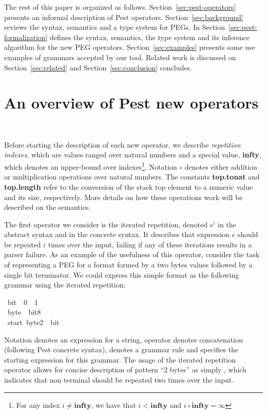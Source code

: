 \documentclass[sigplan,screen]{acmart}
\theoremstyle{definition}
\begin{document}
The rest of this paper is organized as follows.
Section~\ref{sec:pest-operators} presents an informal description of Pest operators.
Section~\ref{sec:background}
reviews the syntax, semantics and a type system for
PEGs. In Section~\ref{sec:pest-formalization} defines the syntax, semantics, the type
system and its inference algorithm for the new PEG operators. Section~\ref{sec:examples}
presents some use examples of grammars accepted by our tool.
Related work is discussed on Section~\ref{sec:related} and
Section~\ref{sec:conclusion} concludes.


\section{An overview of Pest new operators}~\label{sec:pest-operators}

Before starting the description of each new operator, we describe
\emph{repetition indexes}, which are values ranged over natural numbers and a
special value, \textbf{infty}, which denotes an upper-bound over
indexes\footnote{For any index $i \neq \mathbf{infty}$, we have
that $i < \mathbf{infty}$ and $i \circ \mathbf{infty} = \infty$}.
Notation $\circ$ denotes either addition
or multiplication operations over natural numbers. The constants
\textbf{top.tonat} and \textbf{top.length} refer to the conversion
of the stack top element to a numeric value and its size, respectively.
More details on how these operations work will be described
on the semantics.

The first operator we consider is the iterated repetition, denoted $e^i$ in
the abstract syntax and  in the concrete syntax. It describes that
expression $e$ should be repeated $i$ times over the input, failing if any of these iterations
results in a parser failure. As an example of the usefulness of this operator, consider
the task of representing a PEG for a format formed by a two bytes values followed by
a single bit terminator. We could express this simple format as the following
grammar using the iterated repetition:
\begin{tabbing}\ttfamily
~bit~~0~~1\\
\ttfamily ~byte~~bit8\\
\ttfamily ~start~byte2~~bit
\end{tabbing}
Notation  denotes an expression for a string,
operator  denotes concatenation (following Pest concrete syntax),
 denotes a grammar rule and  specifies
the starting expression for this grammar. The usage of the iterated
repetition operator allows for concise description of pattern ``2 bytes''
as simply , which indicates that non terminal 
should be repeated two times over the input.
\end{document}
